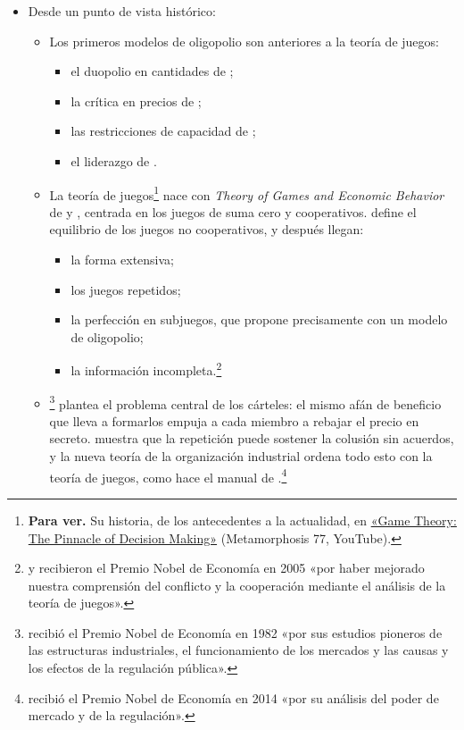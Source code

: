 \documentclass[11pt]{article}
\begin{document}
\begin{itemize}
\begin{itemize}
  \item Desde un punto de vista histórico:
    \begin{itemize}
    \item Los primeros modelos de oligopolio son anteriores a la teoría de juegos:
      \begin{itemize}
      \item el duopolio en cantidades de \textcite{Cournot1838Recherches};
      \item la crítica en precios de \textcite{Bertrand1883Theorie};
      \item las restricciones de capacidad de \textcite{Edgeworth1897Teoria};
      \item el liderazgo de \textcite{Stackelberg1934Marktform}.
      \end{itemize}
    \item La teoría de juegos\footnote{\textbf{Para ver.} Su historia, de los antecedentes a la actualidad, en \href{https://www.youtube.com/watch?v=KHNnuqmRvAU}{«Game Theory: The Pinnacle of Decision Making»} (Metamorphosis 77, YouTube).} nace con \emph{Theory of Games and Economic Behavior} de  y \nocite{VonNeumannMorgenstern1944Theory}, centrada en los juegos de suma cero y cooperativos. \textcite{Nash1950Equilibrium} define el equilibrio de los juegos no cooperativos, y después llegan:
      \begin{itemize}
      \item la forma extensiva\nocite{Kuhn1953Extensive};
      \item los juegos repetidos\nocite{Aumann1959Acceptable};
      \item la perfección en subjuegos, que \textcite{Selten1965Spieltheoretische} propone precisamente con un modelo de oligopolio;
      \item la información incompleta\nocite{Harsanyi1967Games}.\footnote{ y  recibieron el Premio Nobel de Economía en 2005 «por haber mejorado nuestra comprensión del conflicto y la cooperación mediante el análisis de la teoría de juegos»\nocite{Nobel2005AumannSchelling}.}
      \end{itemize}
    \item \textcite{Stigler1964Theory}\footnote{ recibió el Premio Nobel de Economía en 1982 «por sus estudios pioneros de las estructuras industriales, el funcionamiento de los mercados y las causas y los efectos de la regulación pública»\nocite{Nobel1982Stigler}.} plantea el problema central de los cárteles: el mismo afán de beneficio que lleva a formarlos empuja a cada miembro a rebajar el precio en secreto. \textcite{Friedman1971Supergames} muestra que la repetición puede sostener la colusión sin acuerdos, y la nueva teoría de la organización industrial ordena todo esto con la teoría de juegos, como hace el manual de \textcite{Tirole1988Theory}.\footnote{ recibió el Premio Nobel de Economía en 2014 «por su análisis del poder de mercado y de la regulación»\nocite{Nobel2014Tirole}.}

\end{itemize}
\end{itemize}
\end{itemize}
\end{document}
